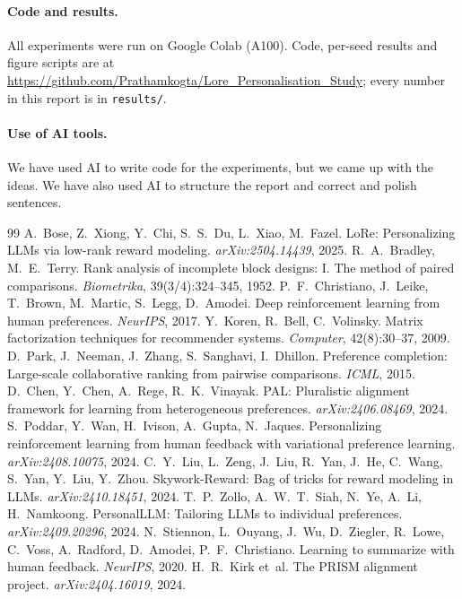\documentclass[11pt,a4paper]{article}
\newcommand{\repourl}{https://github.com/Prathamkogta/Lore_Personalisation_Study}
\begin{document}
\paragraph{Code and results.} All experiments were run on Google Colab (A100). Code, per-seed results
and figure scripts are at \url{\repourl}; every number in this report is in \texttt{results/}.

\paragraph{Use of AI tools.} We have used AI to write code for the experiments, but we came up with the
ideas. We have also used AI to structure the report and correct and polish sentences.

\begin{thebibliography}{99}\small
{} A.~Bose, Z.~Xiong, Y.~Chi, S.~S.~Du, L.~Xiao, M.~Fazel. LoRe: Personalizing LLMs via low-rank reward modeling. \emph{arXiv:2504.14439}, 2025.
 R.~A.~Bradley, M.~E.~Terry. Rank analysis of incomplete block designs: I. The method of paired comparisons. \emph{Biometrika}, 39(3/4):324--345, 1952.
 P.~F.~Christiano, J.~Leike, T.~Brown, M.~Martic, S.~Legg, D.~Amodei. Deep reinforcement learning from human preferences. \emph{NeurIPS}, 2017.
 Y.~Koren, R.~Bell, C.~Volinsky. Matrix factorization techniques for recommender systems. \emph{Computer}, 42(8):30--37, 2009.
 D.~Park, J.~Neeman, J.~Zhang, S.~Sanghavi, I.~Dhillon. Preference completion: Large-scale collaborative ranking from pairwise comparisons. \emph{ICML}, 2015.
 D.~Chen, Y.~Chen, A.~Rege, R.~K.~Vinayak. PAL: Pluralistic alignment framework for learning from heterogeneous preferences. \emph{arXiv:2406.08469}, 2024.
 S.~Poddar, Y.~Wan, H.~Ivison, A.~Gupta, N.~Jaques. Personalizing reinforcement learning from human feedback with variational preference learning. \emph{arXiv:2408.10075}, 2024.
 C.~Y.~Liu, L.~Zeng, J.~Liu, R.~Yan, J.~He, C.~Wang, S.~Yan, Y.~Liu, Y.~Zhou. Skywork-Reward: Bag of tricks for reward modeling in LLMs. \emph{arXiv:2410.18451}, 2024.
 T.~P.~Zollo, A.~W.~T.~Siah, N.~Ye, A.~Li, H.~Namkoong. PersonalLLM: Tailoring LLMs to individual preferences. \emph{arXiv:2409.20296}, 2024.
 N.~Stiennon, L.~Ouyang, J.~Wu, D.~Ziegler, R.~Lowe, C.~Voss, A.~Radford, D.~Amodei, P.~F.~Christiano. Learning to summarize with human feedback. \emph{NeurIPS}, 2020.
 H.~R.~Kirk et~al. The PRISM alignment project. \emph{arXiv:2404.16019}, 2024.
\end{thebibliography}
\end{document}
